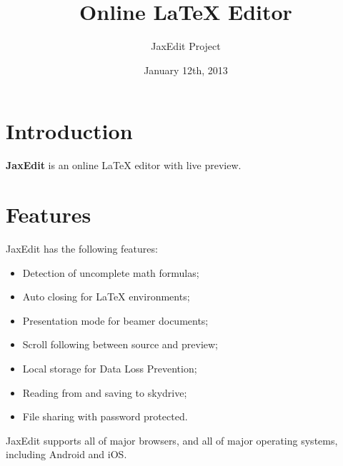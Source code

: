 \documentclass{article}
\begin{document}
\title{Online LaTeX Editor}
\author{JaxEdit Project}
\date{January 12th, 2013}
\maketitle

\tableofcontents

\section{Introduction}

\textbf{JaxEdit} is an online LaTeX editor with live preview.

\section{Features}

JaxEdit has the following features:

\begin{itemize}
\item Detection of uncomplete math formulas;
\item Auto closing for LaTeX environments;
\item Presentation mode for beamer documents;
\item Scroll following between source and preview;
\item Local storage for Data Loss Prevention;
\item Reading from and saving to skydrive;
\item File sharing with password protected.
\end{itemize}

JaxEdit supports all of major browsers, and all of major operating systems, including Android and iOS.
\end{document}
